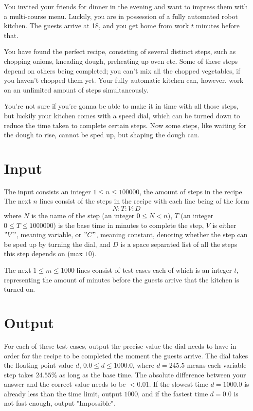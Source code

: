 
You invited your friends for dinner in the evening and want to impress them with a multi-course menu. Luckily, you are in possession of a fully automated robot kitchen. The guests arrive at 18, and you get home from work $t$ minutes before that. 

You have found the perfect recipe, consisting of several distinct steps, such as chopping onions, kneading dough, preheating up oven etc. Some of these steps depend on others being completed; you can't mix all the chopped vegetables, if you haven't chopped them yet. Your fully automatic kitchen can, however, work on an unlimited amount of steps simultaneously.

You're not sure if you're gonna be able to make it in time with all those steps, but luckily your kitchen comes with a speed dial, which can be turned down to reduce the time taken to complete certain steps. Now some steps, like waiting for the dough to rise, cannot be sped up, but shaping the dough can.


\section*{Input}

The input consists an integer $1 \leq n \leq 100000$, the amount of steps in the recipe. The next $n$ lines consist of the steps in the recipe with each line being of the form 
$$
N:T:V:D
$$
where $N$ is the name of the step (an integer $0 \leq N < n$), $T$ (an integer $0 \leq T \leq 1000000$) is the base time in minutes to complete the step, $V$ is either $"V"$, meaning variable, or $"C"$, meaning constant, denoting whether the step can be sped up by turning the dial, and $D$ is a space separated list of all the steps this step depends on (max $10$).

The next $1 \leq m \leq 1000$ lines consist of test cases each of which is an integer $t$, representing the amount of minutes before the guests arrive that the kitchen is turned on. 


\section*{Output}

For each of these test cases, output the precise value the dial needs to have in order for the recipe to be completed the moment the guests arrive. The dial takes the floating point value $d$, $0.0 \leq d \leq 1000.0$, where $d=245.5$ means each variable step takes $24.55\%$ as long as the base time. The absolute difference between your answer and the correct value needs to be $<0.01$. If the slowest time $d = 1000.0$ is already less than the time limit, output $1000$, and if the fastest time $d = 0.0$ is not fast enough, output "Impossible". 